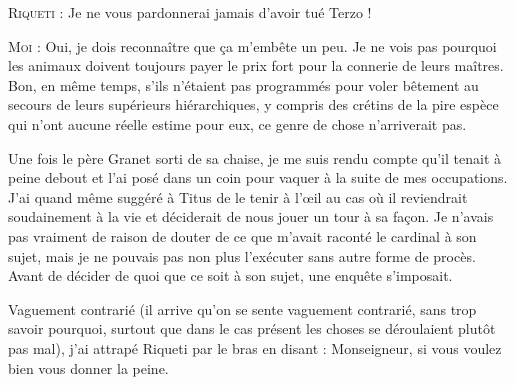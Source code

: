 \begin{dialogue}
\textsc{Riqueti} : Je ne vous pardonnerai jamais d’avoir tué Terzo !

\textsc{Moi} : Oui, je dois reconnaître que ça m’embête un peu. Je ne vois pas pourquoi les animaux doivent toujours payer le prix fort pour la connerie de leurs maîtres. Bon, en même temps, s’ils n’étaient pas programmés pour voler bêtement au secours de leurs supérieurs hiérarchiques, y compris des crétins de la pire espèce qui n’ont aucune réelle estime pour eux, ce genre de chose n’arriverait pas.

\end{dialogue}

Une fois le père Granet sorti de sa chaise, je me suis rendu compte qu’il tenait à peine debout et l’ai posé dans un coin pour vaquer à la suite de mes occupations. J’ai quand même suggéré à Titus de le tenir à l’œil au cas où il reviendrait soudainement à la vie et déciderait de nous jouer un tour à sa façon. Je n’avais pas vraiment de raison de douter de ce que m’avait raconté le cardinal à son sujet, mais je ne pouvais pas non plus l’exécuter sans autre forme de procès. Avant de décider de quoi que ce soit à son sujet, une enquête s’imposait.

Vaguement contrarié (il arrive qu’on se sente vaguement contrarié, sans trop savoir pourquoi, surtout que dans le cas présent les choses se déroulaient plutôt pas mal), j’ai attrapé Riqueti par le bras en disant : Monseigneur, si vous voulez bien vous donner la peine.

